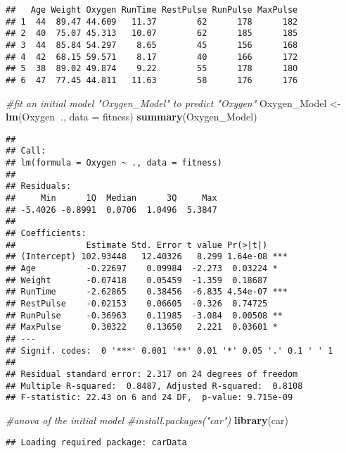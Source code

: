 \documentclass[]{article}
\newenvironment{Shaded}{\begin{snugshade}}{\end{snugshade}}
\newcommand{\KeywordTok}[1]{\textcolor[rgb]{0.13,0.29,0.53}{\textbf{#1}}}
\newcommand{\DataTypeTok}[1]{\textcolor[rgb]{0.13,0.29,0.53}{#1}}
\newcommand{\StringTok}[1]{\textcolor[rgb]{0.31,0.60,0.02}{#1}}
\newcommand{\CommentTok}[1]{\textcolor[rgb]{0.56,0.35,0.01}{\textit{#1}}}
\newcommand{\OperatorTok}[1]{\textcolor[rgb]{0.81,0.36,0.00}{\textbf{#1}}}
\newcommand{\NormalTok}[1]{#1}
\begin{document}
\begin{verbatim}
##   Age Weight Oxygen RunTime RestPulse RunPulse MaxPulse
## 1  44  89.47 44.609   11.37        62      178      182
## 2  40  75.07 45.313   10.07        62      185      185
## 3  44  85.84 54.297    8.65        45      156      168
## 4  42  68.15 59.571    8.17        40      166      172
## 5  38  89.02 49.874    9.22        55      178      180
## 6  47  77.45 44.811   11.63        58      176      176
\end{verbatim}

\begin{Shaded}
\begin{Highlighting}[]
\CommentTok{#fit an initial model "Oxygen_Model" to predict "Oxygen"}
\NormalTok{Oxygen_Model <-}\StringTok{ }\KeywordTok{lm}\NormalTok{(Oxygen}\OperatorTok{~}\NormalTok{., }\DataTypeTok{data =}\NormalTok{ fitness)}
\KeywordTok{summary}\NormalTok{(Oxygen_Model)}
\end{Highlighting}
\end{Shaded}

\begin{verbatim}
## 
## Call:
## lm(formula = Oxygen ~ ., data = fitness)
## 
## Residuals:
##     Min      1Q  Median      3Q     Max 
## -5.4026 -0.8991  0.0706  1.0496  5.3847 
## 
## Coefficients:
##              Estimate Std. Error t value Pr(>|t|)    
## (Intercept) 102.93448   12.40326   8.299 1.64e-08 ***
## Age          -0.22697    0.09984  -2.273  0.03224 *  
## Weight       -0.07418    0.05459  -1.359  0.18687    
## RunTime      -2.62865    0.38456  -6.835 4.54e-07 ***
## RestPulse    -0.02153    0.06605  -0.326  0.74725    
## RunPulse     -0.36963    0.11985  -3.084  0.00508 ** 
## MaxPulse      0.30322    0.13650   2.221  0.03601 *  
## ---
## Signif. codes:  0 '***' 0.001 '**' 0.01 '*' 0.05 '.' 0.1 ' ' 1
## 
## Residual standard error: 2.317 on 24 degrees of freedom
## Multiple R-squared:  0.8487, Adjusted R-squared:  0.8108 
## F-statistic: 22.43 on 6 and 24 DF,  p-value: 9.715e-09
\end{verbatim}

\begin{Shaded}
\begin{Highlighting}[]
\CommentTok{#anova of the initial model}
\CommentTok{#install.packages("car")}
\KeywordTok{library}\NormalTok{(car)}
\end{Highlighting}
\end{Shaded}

\begin{verbatim}
## Loading required package: carData
\end{verbatim}
\end{document}
